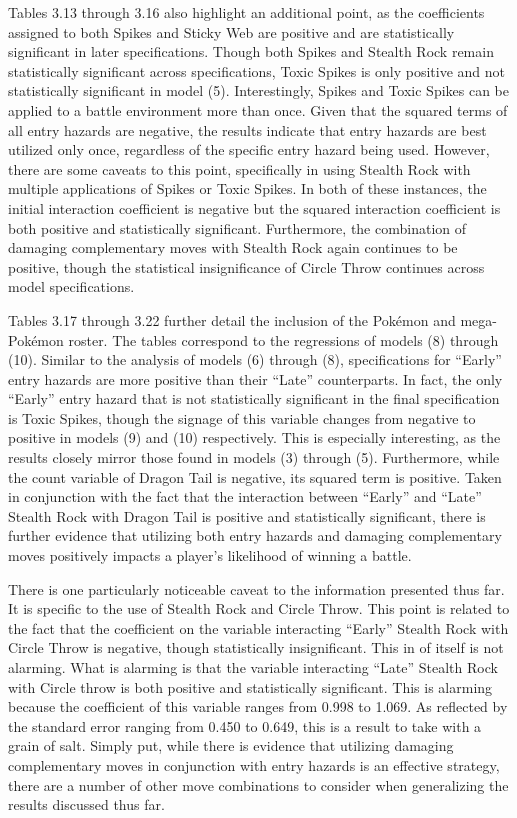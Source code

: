 \documentclass[12pt,twoside]{reedthesis}
\begin{document}
  Tables 3.13 through 3.16 also highlight an additional point, as the
  coefficients assigned to both Spikes and Sticky Web are positive and are
  statistically significant in later specifications. Though both Spikes
  and Stealth Rock remain statistically significant across specifications,
  Toxic Spikes is only positive and not statistically significant in model
  (5). Interestingly, Spikes and Toxic Spikes can be applied to a battle
  environment more than once. Given that the squared terms of all entry
  hazards are negative, the results indicate that entry hazards are best
  utilized only once, regardless of the specific entry hazard being used.
  However, there are some caveats to this point, specifically in using
  Stealth Rock with multiple applications of Spikes or Toxic Spikes. In
  both of these instances, the initial interaction coefficient is negative
  but the squared interaction coefficient is both positive and
  statistically significant. Furthermore, the combination of damaging
  complementary moves with Stealth Rock again continues to be positive,
  though the statistical insignificance of Circle Throw continues across
  model specifications.
  
  Tables 3.17 through 3.22 further detail the inclusion of the Pokémon and
  mega-Pokémon roster. The tables correspond to the regressions of models
  (8) through (10). Similar to the analysis of models (6) through (8),
  specifications for ``Early'' entry hazards are more positive than their
  ``Late'' counterparts. In fact, the only ``Early'' entry hazard that is
  not statistically significant in the final specification is Toxic
  Spikes, though the signage of this variable changes from negative to
  positive in models (9) and (10) respectively. This is especially
  interesting, as the results closely mirror those found in models (3)
  through (5). Furthermore, while the count variable of Dragon Tail is
  negative, its squared term is positive. Taken in conjunction with the
  fact that the interaction between ``Early'' and ``Late'' Stealth Rock
  with Dragon Tail is positive and statistically significant, there is
  further evidence that utilizing both entry hazards and damaging
  complementary moves positively impacts a player's likelihood of winning
  a battle.
  
  There is one particularly noticeable caveat to the information presented
  thus far. It is specific to the use of Stealth Rock and Circle Throw.
  This point is related to the fact that the coefficient on the variable
  interacting ``Early'' Stealth Rock with Circle Throw is negative, though
  statistically insignificant. This in of itself is not alarming. What is
  alarming is that the variable interacting ``Late'' Stealth Rock with
  Circle throw is both positive and statistically significant. This is
  alarming because the coefficient of this variable ranges from 0.998 to
  1.069. As reflected by the standard error ranging from 0.450 to 0.649,
  this is a result to take with a grain of salt. Simply put, while there
  is evidence that utilizing damaging complementary moves in conjunction
  with entry hazards is an effective strategy, there are a number of other
  move combinations to consider when generalizing the results discussed
  thus far.
  
\end{document}

